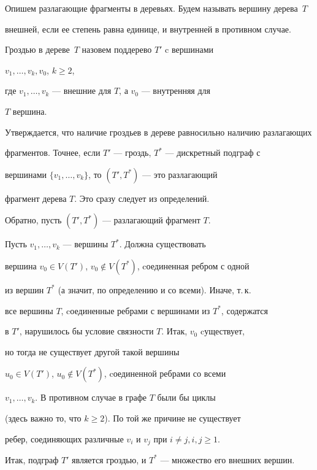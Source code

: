 \begin{exam}


Опишем разлагающие фрагменты в деревьях. Будем называть вершину дерева~$T$ 


внешней, если ее степень равна единице, и внутренней в противном случае.


Гроздью в дереве~$T$ назовем поддерево $T'$ c вершинами 


$v_1,\dotsc , v_k, v_0$, $k\geq2$,


где $v_1,\dotsc , v_k$ --- внешние для $T$, а $v_0$ --- внутренняя для


$T$ вершина.





Утверждается, что наличие гроздьев в дереве равносильно наличию разлагающих 


фрагментов. Точнее, если $T'$ --- гроздь, $T^*$ --- дискретный подграф с 


вершинами $\{ v_1,\dotsc , v_k\}$, то $(T', T^*)$ --- это разлагающий 


фрагмент дерева $T$. Это сразу следует из определений.





Обратно, пусть $(T', T^*)$ --- разлагающий фрагмент $T$. 


Пусть $v_1,\dotsc , v_k$ --- вершины $T^*$. Должна существовать 


вершина $v_0\in V(T')$, $v_0\notin V(T^*)$, cоединенная ребром с одной 


из вершин $T^*$ (а значит, по определению и со всеми). Иначе, т.\,к. 


все вершины $T$, cоединенные ребрами с вершинами из $T^*$, содержатся 


в $T'$, нарушилось бы условие связности $T$. Итак, $v_0$ cуществует, 


но тогда не существует другой такой вершины 


$u_0\in V(T')$, $u_0\notin V(T^*)$, cоединенной ребрами со всеми 


$v_1,\dotsc , v_k$. В противном случае в графе $T$ были бы циклы 


(здесь важно то, что $k\geq 2$). По той же причине не существует 


ребер, соединяющих различные $v_i$ и $v_j$ при $i\neq j, i, j\geq 1$. 


Итак, подграф $T'$ является гроздью, и $T^*$ --- множество его внешних вершин.


\end{exam}





